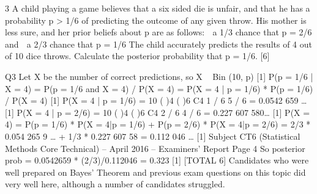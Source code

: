 \documentclass[a4paper,12pt]{article}
\begin{document}
3 A child playing a game believes that a six sided die is unfair, and that he has a
probability p > 1/6 of predicting the outcome of any given throw. His mother is less
sure, and her prior beliefs about p are as follows:
   a 1/3 chance that p = 2/6 and
 a 2/3 chance that p = 1/6
The child accurately predicts the results of 4 out of 10 dice throws.
Calculate the posterior probability that p = 1/6. [6]

Q3 Let X be the number of correct predictions, so X ~ Bin (10, p) [1]
P(p = 1/6 | X = 4) = P(p = 1/6 and X = 4) / P(X = 4)
= P(X = 4 | p = 1/6) * P(p = 1/6) / P(X = 4) [1]
P(X = 4 | p = 1/6) = 10 ( )4 ( )6
C4 1 / 6 5 / 6 = 0.0542 659 … [1]
P(X = 4 | p = 2/6) = 10 ( )4 ( )6
C4 2 / 6 4 / 6 = 0.227 607 580… [1]
P(X = 4) = P(p = 1/6) * P(X = 4|p = 1/6) + P(p = 2/6) * P(X = 4|p = 2/6)
= 2/3 * 0.054 265 9 … + 1/3 * 0.227 607 58
= 0.112 046 … [1]
Subject CT6 (Statistical Methods Core Technical) – April 2016 – Examiners’ Report
Page 4
So posterior prob = 0.0542659 * (2/3)/0.112046 = 0.323 [1]
[TOTAL 6]
Candidates who were well prepared on Bayes’ Theorem and previous exam
questions on this topic did very well here, although a number of candidates
struggled.
\end{document}
